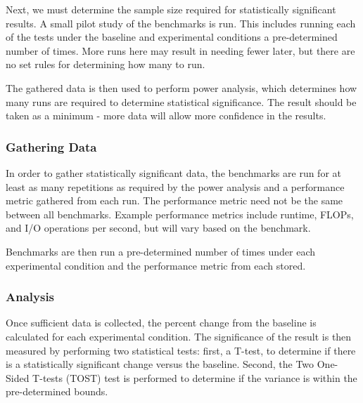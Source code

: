\documentclass[conference]{IEEEtran}
\begin{document}
Next, we must determine the sample size required for statistically significant 
results. A small pilot study of the benchmarks is run. This includes running 
each of the tests under the baseline and experimental conditions a 
pre-determined number of times. More runs here may result in needing fewer 
later, but there are no set rules for determining how many to run.

The gathered data is then used to perform power analysis, which determines how 
many runs are required to determine statistical significance. The result should 
be taken as a minimum - more data will allow more confidence in the results.

\subsubsection{Gathering Data}

In order to gather statistically significant data, the benchmarks are run 
for at least as many repetitions as required by the power analysis and a
performance metric gathered from each run. The performance 
metric need not be the same between all benchmarks. Example performance metrics 
include runtime, FLOPs, and I/O operations per second, but will vary based on 
the benchmark.

Benchmarks are then run a pre-determined number of times under each 
experimental condition and the performance metric from each stored.



\subsubsection{Analysis}

Once sufficient data is collected, the percent change from the baseline is 
calculated for each experimental condition. The significance of the result is 
then measured by performing two 
statistical tests: first, a T-test, to determine if there is a statistically 
significant change versus the baseline. Second, the Two One-Sided T-tests (TOST) 
test is performed to determine if the variance is within the pre-determined 
bounds.
\end{document}
